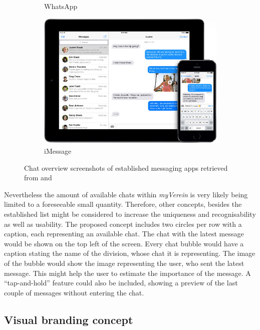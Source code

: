 \begin{figure}[h]
\begin{subfigure}{.33\textwidth}
  		\caption{WhatsApp}
  		\label{fig:ChatWA}
	\end{subfigure}
	\begin{subfigure}{.66\textwidth}
  		\centering
  		\includegraphics[width=0.98\linewidth]{./images/imessage-screen.jpg}
  		\caption{iMessage}
  		\label{fig:ChatiMessage}
	\end{subfigure}
	\caption{Chat overview screenshots of established messaging apps retrieved from \cite{Inc.:2015aa} and \cite{Stuckler:2013aa}}
	\label{fig:ChatScreens}
\end{figure}
\nocite{Inc.:2015aa, Stuckler:2013aa}

Nevertheless the amount of available chats within \emph{myVerein} is very likely being limited to a foreseeable small quantity. Therefore, other concepts, besides the established list might be considered to increase the uniqueness and recognisability as well as usability. The proposed concept includes two circles per row with a caption, each representing an available chat. The chat with the latest message would be shown on the top left of the screen. Every chat bubble would have a caption stating the name of the division, whose chat it is representing. The image of the bubble would show the image representing the user, who sent the latest message. This might help the user to estimate the importance of the message. A \enquote{tap-and-hold} feature could also be included, showing a preview of the last couple of messages without entering the chat.

\subsection{Visual branding concept}
\label{sec:BrandingConcept}

